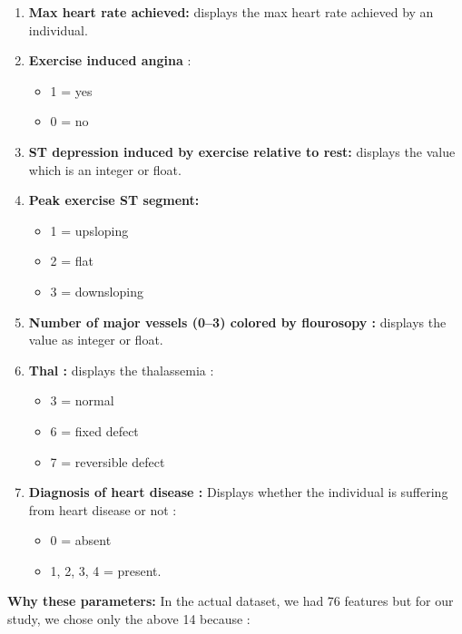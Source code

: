 \documentclass[oneside,12pt]{Classes/VTU}
\begin{document}
\begin{enumerate}
  	\item \textbf{Max heart rate achieved:} displays the max heart rate achieved by an individual.
  	\item \textbf{Exercise induced angina} :
	  	\begin{itemize}
  			\item 1 = yes
  			\item 0 = no
  		\end{itemize}
  	
  	\item \textbf{ST depression induced by exercise relative to rest:} displays the value which is an integer or float.
  	
  	\item \textbf{Peak exercise ST segment:}
  		\begin{itemize}
	  		\item 1 = upsloping
  			\item 2 = flat
  			\item 3 = downsloping
 	 	\end{itemize}
  	
  	\item \textbf{Number of major vessels (0–3) colored by flourosopy :} displays the value as integer or float.
  	
  	\item \textbf{Thal :} displays the thalassemia :
  		\begin{itemize}
  			\item 3 = normal
  			\item 6 = fixed defect
  			\item 7 = reversible defect
  		\end{itemize}
  	
  	\item \textbf{Diagnosis of heart disease :} Displays whether the individual is suffering from heart disease or not :
  	\begin{itemize}
  		\item 0 = absent
  		\item 1, 2, 3, 4 = present.
  	\end{itemize}
  	
  \end{enumerate}

	\textbf{Why these parameters:}
	In the actual dataset, we had 76 features but for our study, we chose only the above 14 because :
	
\end{document}
